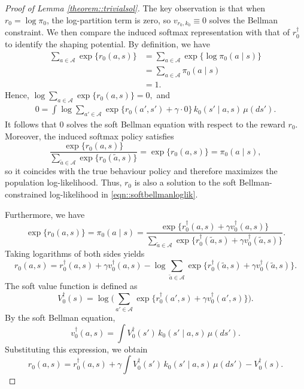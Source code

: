 \documentclass[11pt]{article}
\theoremstyle{plain}
\begin{document}
\begin{proof}[Proof of Lemma \ref{theorem::trivialsol}]
The key observation is that when \(r_0=\log\pi_0\), the log-partition term is
zero, so \(v_{r_0,k_0}\equiv 0\) solves the Bellman constraint. We then compare
the induced softmax representation with that of \(r_0^\dagger\) to identify the
shaping potential. By definition, we have
\begin{align*}
\sum_{a \in \mathcal{A}} \exp\{ r_0(a,s) \}
&= \sum_{a \in \mathcal{A}} \exp\{ \log \pi_0(a \mid s) \}  \\
&= \sum_{a \in \mathcal{A}} \pi_0(a \mid s) \\
&= 1.
\end{align*}
Hence, $\log \sum_{a \in \mathcal{A}} \exp\{ r_0(a,s) \} = 0,$
and
\begin{align*}
0 = \int \log \sum_{a' \in \mathcal{A}} \exp\{ r_0(a',s') + \gamma \cdot 0 \} \,
k_0(s' \mid a, s) \,\mu(ds').
\end{align*}
It follows that \(0\) solves the soft Bellman equation with respect to the
reward \(r_0\). Moreover, the induced softmax policy satisfies
\[
\frac{\exp\{r_0(a,s)\}}{\sum_{\tilde a \in \mathcal{A}} \exp\{r_0(\tilde a,s)\}}
= \exp\{r_0(a,s)\}
= \pi_0(a \mid s),
\]
so it coincides with the true behaviour policy and therefore maximizes the
population log-likelihood. Thus, \(r_0\) is also a solution to the soft
Bellman-constrained log-likelihood in \eqref{eqn::softbellmanloglik}.


Furthermore, we have
\[
\exp\{r_0(a,s)\} = \pi_0(a \mid s) 
= \frac{\exp\{r_0^\dagger(a,s) + \gamma v_0^\dagger(a,s)\}}{\sum_{\tilde a \in \mathcal{A}} \exp\{r_0^\dagger(\tilde a,s) + \gamma v_0^\dagger(\tilde a,s)\}}.
\]
Taking logarithms of both sides yields
\[
r_0(a,s) = r_0^\dagger(a,s) + \gamma v_0^\dagger(a,s) 
- \log \sum_{\tilde a \in \mathcal{A}} \exp\{r_0^\dagger(\tilde a,s) + \gamma v_0^\dagger(\tilde a,s)\}.
\]
The soft value function is defined as
\[
V_{0}^{\dagger}(s) = \log \Bigg( \sum_{a' \in \mathcal{A}} 
\exp\big\{ r_0^\dagger(a',s) + \gamma v_0^\dagger(a', s)\big\} \Bigg).
\]   
By the soft Bellman equation,
\[
v_0^\dagger(a,s)  = \int  V_{0}^{\dagger}(s') \, k_0(s' \mid a , s) \, \mu(ds').
\]
Substituting this expression, we obtain
\[
r_0(a,s) = r_0^\dagger(a,s) + \gamma \int V_{0}^{\dagger}(s') \, k_0(s' \mid a , s) \, \mu(ds') - V_{0}^{\dagger}(s).
\]


 

    
\end{proof}
\end{document}
